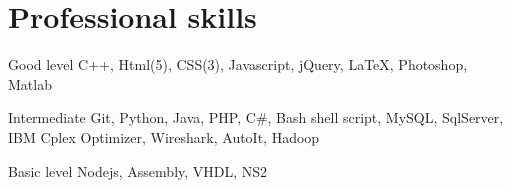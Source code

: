 \documentclass{tccv}
\begin{document}
\if
\section{Professional skills}

\begin{factlist}

\item{Good level}
     {C++, Html(5), CSS(3), Javascript, jQuery, \LaTeX, Photoshop, Matlab}

\item{Intermediate}
     {Git, Python, Java, PHP, C\#, Bash shell script, MySQL, SqlServer, IBM Cplex Optimizer, Wireshark, AutoIt, Hadoop}

\item{Basic level}
     {Nodejs, Assembly, VHDL, NS2}

\end{factlist}

\fi
\end{document}
